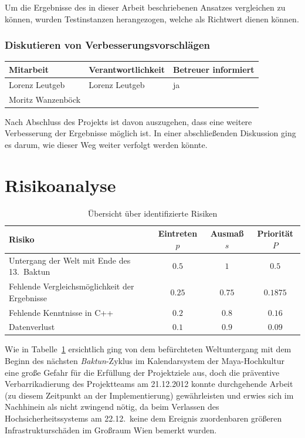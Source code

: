 Um die Ergebnisse des in dieser Arbeit beschriebenen Ansatzes vergleichen zu können, wurden Testinstanzen herangezogen, welche als Richtwert dienen können.

\subsubsection{Diskutieren von Verbesserungsvorschlägen}

\begin{center}
\begin{tabular}{lll}
	Mitarbeit & Verantwortlichkeit & Betreuer informiert \\
	\hline
	Lorenz Leutgeb & Lorenz Leutgeb & ja \\
	Moritz Wanzenböck & & \\
\end{tabular}
\end{center}

Nach Abschluss des Projekts ist davon auszugehen, dass eine weitere Verbesserung der Ergebnisse möglich ist. In einer abschließenden Diskussion ging es darum, wie dieser Weg weiter verfolgt werden könnte.

\section{Risikoanalyse}
\begin{table}
\centering
\begin{tabular}{lccc}
Risiko & Eintreten $p$ & Ausmaß $s$ & Priorität $P$\\
\hline
Untergang der Welt mit Ende des 13.\ Baktun & $0.5$ & $1$ & $0.5$\\
Fehlende Vergleichsmöglichkeit der Ergebnisse & $0.25$ & $0.75$ & $0.1875$ \\
Fehlende Kenntnisse in C++ & $0.2$ & $0.8$ & $0.16$ \\
Datenverlust & $0.1$ & $0.9$ & $0.09$ \\
\end{tabular}
\caption{Übersicht über identifizierte Risiken}
\label{tab:risk}
\end{table}

Wie in Tabelle~\ref{tab:risk} ersichtlich ging von dem befürchteten Weltuntergang mit dem Beginn des nächsten \textit{Baktun}-Zyklus im Kalendarsystem der Maya-Hochkultur eine große Gefahr für die Erfüllung der Projektziele aus, doch die präventive Verbarrikadierung des Projektteams am 21.12.2012 konnte  durchgehende Arbeit (zu diesem Zeitpunkt an der Implementierung) gewährleisten und erwies sich im Nachhinein als nicht zwingend nötig, da beim Verlassen des Hochsicherheitssystems am 22.12.\ keine dem Ereignis zuordenbaren größeren Infrastrukturschäden im Großraum Wien bemerkt wurden.

